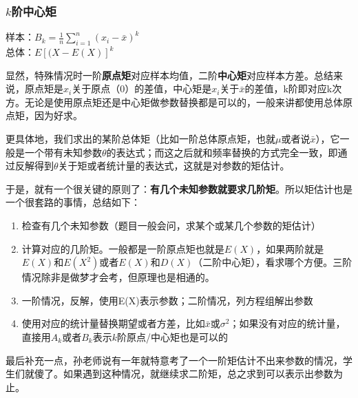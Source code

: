 \documentclass[10pt, a4paper]{article}
\begin{document}
\subsubsection*{$k$阶中心矩}
\begin{center}
样本：$B_k=\frac{1}{n}\sum_{i=1}^{n}(x_i - \bar x)^k$ \\
总体：$E[(X - E(X)]^k$
\end{center}\par
显然，特殊情况时一阶\textbf{原点矩}对应样本均值，二阶\textbf{中心矩}对应样本方差。总结来说，原点矩是$x_i$关于原点（0）的差值，中心矩是$x_i$关于$\bar x$的差值，k阶即对应k次方。无论是使用原点矩还是中心矩做参数替换都是可以的，一般来讲都使用总体原点矩，因为好求。\par
更具体地，我们求出的某阶总体矩（比如一阶总体原点矩，也就$\mu$或者说$\bar x$），它一般是一个带有未知参数$\theta$的表达式；而这之后就和频率替换的方式完全一致，即通过反解得到$\theta$关于矩或者统计量的表达式，这就是对参数的矩估计。\par
于是，就有一个很关键的原则了：\textbf{有几个未知参数就要求几阶矩}。所以矩估计也是一个很套路的事情，总结如下：
\begin{enumerate}
    \item 检查有几个未知参数（题目一般会问，求某个或某几个参数的矩估计）
    \item 计算对应的几阶矩。一般都是一阶原点矩也就是$E(X)$，如果两阶就是$E(X)和E(X^2)$或者$E(X)和D(X)$（二阶中心矩），看求哪个方便。三阶情况除非是做梦才会考，但原理也是相通的。
    \item 一阶情况，反解，使用E(X)表示参数；二阶情况，列方程组解出参数
    \item 使用对应的统计量替换期望或者方差，比如$\bar x$或$\sigma^2$；如果没有对应的统计量，直接用$A_k$或者$B_k$表示$k$阶原点/中心矩也是可以的
\end{enumerate}
\par
最后补充一点，孙老师说有一年就特意考了一个一阶矩估计不出来参数的情况，学生们就傻了。如果遇到这种情况，就继续求二阶矩，总之求到可以表示出参数为止。
\end{document}
